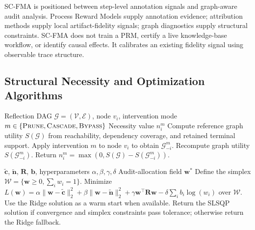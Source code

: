 \documentclass[a4paper,fleqn]{cas-sc}
\begin{document}
SC-FMA is positioned between step-level annotation signals and graph-aware audit analysis. Process Reward Models supply annotation evidence; attribution methods supply local artifact-fidelity signals; graph diagnostics supply structural constraints. SC-FMA does not train a PRM, certify a live knowledge-base workflow, or identify causal effects. It calibrates an existing fidelity signal using observable trace structure.

\subsection{Structural Necessity and Optimization Algorithms}
\label{app:algorithms}

\begin{algorithm}[ht]
\caption{Structural Necessity Computation}
\label{alg:supp-structural-necessity}
\begin{algorithmic}[1]
\Require Reflection DAG $\mathcal{G}=(\mathcal{V},\mathcal{E})$, node $v_i$, intervention mode $m\in\{\textsc{Prune},\textsc{Cascade},\textsc{Bypass}\}$
\Ensure Necessity value $n_i^{m}$
\State Compute reference graph utility $S(\mathcal{G})$ from reachability, dependency coverage, and retained terminal support.
\State Apply intervention $m$ to node $v_i$ to obtain $\mathcal{G}_{-i}^{m}$.
\State Recompute graph utility $S(\mathcal{G}_{-i}^{m})$.
\State Return $n_i^{m}=\max(0,S(\mathcal{G})-S(\mathcal{G}_{-i}^{m}))$.
\end{algorithmic}
\end{algorithm}

\begin{algorithm}[ht]
\caption{SC-FMA QP Calibration}
\label{alg:supp-scfma-qp}
\begin{algorithmic}[1]
\Require $\tilde{\mathbf{c}}$, $\tilde{\mathbf{n}}$, $\mathbf{R}$, $\mathbf{b}$, hyperparameters $\alpha,\beta,\gamma,\delta$
\Ensure Audit-allocation field $\mathbf{w}^*$
\State Define the simplex $\mathcal{W}=\{\mathbf{w}\ge 0,\sum_i w_i=1\}$.
\State Minimize $L(\mathbf{w})=\alpha\|\mathbf{w}-\tilde{\mathbf{c}}\|_2^2+\beta\|\mathbf{w}-\tilde{\mathbf{n}}\|_2^2+\gamma\mathbf{w}^\top\mathbf{R}\mathbf{w}-\delta\sum_i b_i\log(w_i)$ over $\mathcal{W}$.
\State Use the Ridge solution as a warm start when available.
\State Return the SLSQP solution if convergence and simplex constraints pass tolerance; otherwise return the Ridge fallback.
\end{algorithmic}
\end{algorithm}
\end{document}

